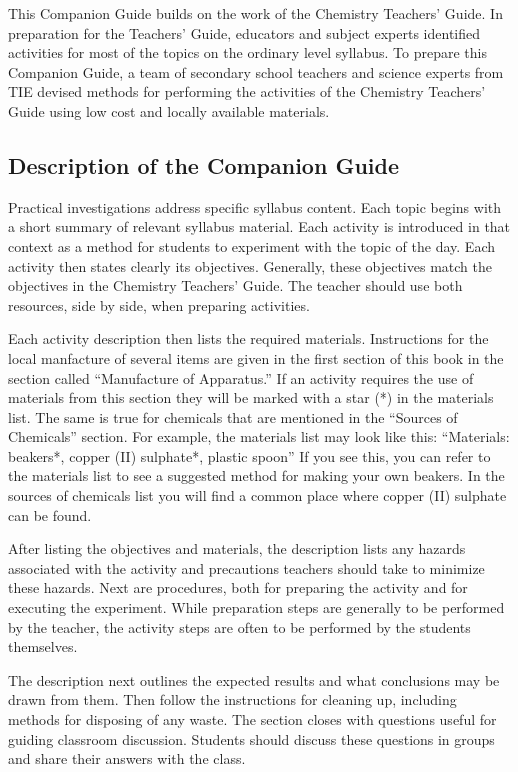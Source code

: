 This Companion Guide builds on the work of the Chemistry Teachers' Guide. In preparation for the Teachers' Guide, educators and subject experts identified activities for most of the topics on the ordinary level syllabus. To prepare this Companion Guide, a team of secondary school teachers and science experts from TIE devised methods for performing the activities of the Chemistry Teachers' Guide using low cost and locally available materials.

\subsection*{Description of the Companion Guide}

Practical investigations address specific syllabus content. Each topic begins with a short summary of relevant syllabus material. Each activity is introduced in that context as a method for students to experiment with the topic of the day. Each activity then states clearly its objectives. Generally, these objectives match the objectives in the Chemistry Teachers' Guide. The teacher should use both resources, side by side, when preparing activities.

Each activity description then lists the required materials. Instructions for the local manfacture of several items are given in the first section of this book in the section called ``Manufacture of Apparatus.'' If an activity requires the use of materials from this section they will be marked with a star (*) in the materials list. The same is true for chemicals that are mentioned in the ``Sources of Chemicals'' section. For example, the materials list may look like this:
``Materials: beakers*, copper (II) sulphate*, plastic spoon''
If you see this, you can refer to the materials list to see a suggested method for making your own beakers. In the sources of chemicals list you will find a common place where copper (II) sulphate can be found. 

After listing the objectives and materials, the description lists any hazards associated with the activity and precautions teachers should take to minimize these hazards. Next are procedures, both for preparing the activity and for executing the experiment. While preparation steps are generally to be performed by the teacher, the activity steps are often to be performed by the students themselves.

The description next outlines the expected results and what conclusions may be drawn from them. Then follow the instructions for cleaning up, including methods for disposing of any waste. The section closes with questions useful for guiding classroom discussion. Students should discuss these questions in groups and share their answers with the class.

